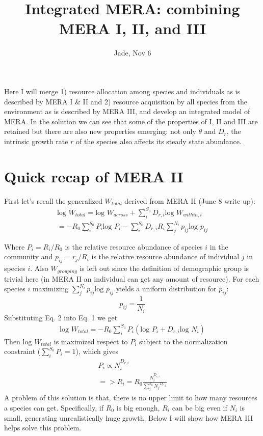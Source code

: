 \documentclass[12pt]{article}
\date{}
\title{\Large \textbf{Integrated MERA: combining MERA I, II, and III}}
\author{Jade, Nov 6}
\begin{document}
\maketitle
\raggedright
\large
\setlength{\parindent}{15pt}
Here I will merge 1) resource allocation among species and individuals as is described by MERA I \& II and 2) resource acquisition by all species from the environment as is described by MERA III, and develop an integrated model of MERA. In the solution we can see that some of the properties of I, II and III are retained but there are also new properties emerging: not only $\theta$ and $D_r$, the intrinsic growth rate $r$ of the species also affects its steady state abundance.

\section{Quick recap of MERA II}
First let's recall the generalized $W_{total}$ derived from MERA II (June 8 write up):
 \begin{equation}
 \begin{split}
 \mbox{log }W_{total} =  \mbox{log }W_{across}+\sum^{S_0}_i D_{r,i} \mbox{log }W_{within,i}\\
 =  - R_{0}\sum^{S_0}_i P_i\mbox{log } P_i - \sum^{S_0}_i D_{r,i} R_i  \sum^{N_i}_j p_{ij} \mbox{log } p_{ij}
 \end{split}
\end{equation}

Where $P_i = R_i/R_0$ is the relative resource abundance of species $i$ in the community and $p_{ij}= r_j/R_i$ is the relative resource abundance of individual $j$ in species $i$.  Also $W_{grouping}$ is left out since the definition of demographic group is trivial here (in MERA II an individual can get any amount of resource). For each species $i$ maximizing $\sum^{N_i}_j p_{ij} \mbox{log } p_{ij}$ yields a uniform distribution for $p_{ij}$:
 \begin{equation}
p_{ij} = \frac{1}{N_i}
\end{equation}
Substituting Eq. 2 into Eq. 1 we get
 \begin{equation}
 \begin{split}
 \mbox{log }W_{total} =  - R_{0}\sum^{S_0}_i P_i (\mbox{log } P_i + D_{r,i} \mbox{log } N_i)
\end{split}
\end{equation}
 Then $ \mbox{log }W_{total}$ is maximized respect to $P_i$ subject to the normalization constraint ($\sum^{S_0}_i P_i = 1$), which gives
  \begin{equation}
 \begin{split}
 P_i \propto N_i^{D_{r,i}}\\
 =>  R_i = R_0 \frac{N_i^{D_{r,i}}}{\sum^{S_0}_j {N_j}^{D_{r,j}}}
\end{split}
\end{equation}
A problem of this solution is that, there is no upper limit to how many resources a species can get. Specifically, if $R_0$ is big enough, $R_i$ can be big even if $N_i$ is small, generating unrealistically huge growth. Below I will show how MERA III helps solve this problem.
\end{document}

